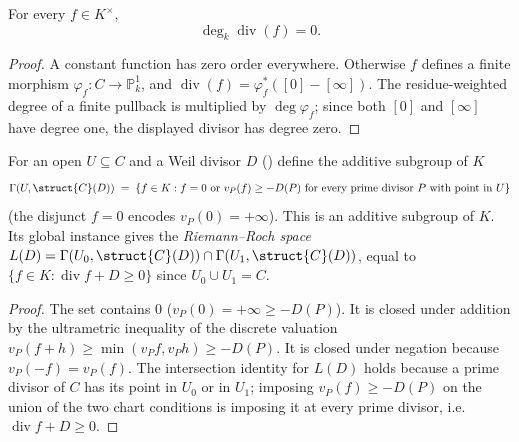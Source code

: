 \begin{theorem}
  \label{thm:adelic_principal_degree_zero}
  For every \(f\in K^\times\),
  \[
    \deg_k\operatorname{div}(f)=0.
  \]
\end{theorem}
\begin{proof}
  A constant function has zero order everywhere.  Otherwise \(f\) defines
  a finite morphism \(\varphi_f\colon C\to\mathbb P^1_k\), and
  \(\operatorname{div}(f)=\varphi_f^*([0]-[\infty])\).  The
  residue-weighted degree of a finite pullback is multiplied by
  \(\deg\varphi_f\); since both \([0]\) and \([\infty]\) have degree one,
  the displayed divisor has degree zero.
\end{proof}

\begin{definition}
  \label{def:adelic_sectionOfDivisor}
  \leanok
  For an open \(U \subseteq C\) and a Weil divisor \(D\)
  () define the additive subgroup of \(K\)
  \[
    \Gamma(U, \struct{C}(D)) \;=\;
      \{ f \in K : f = 0 \text{ or } v_P(f) \ge -D(P) \text{ for every
         prime divisor } P \text{ with point in } U\}
  \]
  (the disjunct \(f = 0\) encodes \(v_P(0) = +\infty\)).  This is an
  additive subgroup of \(K\).  Its global instance gives the
  \emph{Riemann--Roch space}
  \(L(D) = \Gamma(U_0, \struct{C}(D)) \cap \Gamma(U_1, \struct{C}(D))\),
  equal to \(\{ f \in K : \operatorname{div} f + D \ge 0\}\) since
  \(U_0 \cup U_1 = C\).
\end{definition}
\begin{proof}
  \leanok
  The set contains \(0\)
  (\(v_P(0) = +\infty \ge -D(P)\)). It is closed under addition by the
  ultrametric inequality of the discrete valuation
  \(v_P(f + h) \ge \min(v_P f, v_P h) \ge -D(P)\). It is closed under
  negation because \(v_P(-f)=v_P(f)\).
  The intersection identity for \(L(D)\) holds because a prime divisor of
  \(C\) has its point in \(U_0\) or in \(U_1\); imposing \(v_P(f) \ge
  -D(P)\) on the union of the two chart conditions is imposing it at
  every prime divisor, i.e.\ \(\operatorname{div} f + D \ge 0\).
\end{proof}


